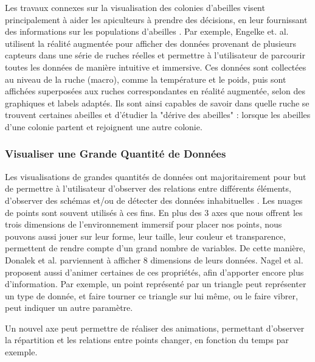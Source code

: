 	
		
		Les travaux connexes sur la visualisation des colonies d'abeilles visent principalement à aider les apiculteurs à prendre des décisions, en leur fournissant des informations sur les populations d'abeilles \cite{engelke_visual_2016, engelke_melissar_2016, nguyen_augmented_2017}. Par exemple, Engelke et. al. \cite{engelke_visual_2016} utilisent la réalité augmentée pour afficher des données provenant de plusieurs capteurs dans une série de ruches réelles et permettre à l'utilisateur de parcourir toutes les données de manière intuitive et immersive. Ces données sont collectées au niveau de la ruche (macro), comme la température et le poids, puis sont affichées superposées aux ruches correspondantes en réalité augmentée, selon des graphiques et labels adaptés. Ils sont ainsi capables de savoir dans quelle ruche se trouvent certaines abeilles et d'étudier la "dérive des abeilles" : lorsque les abeilles d'une colonie partent et rejoignent une autre colonie.
	
	\subsubsection{Visualiser une Grande Quantité de Données}
	
	 Les visualisations de grandes quantités de données ont majoritairement pour but de permettre à l'utilisateur d'observer des relations entre différents éléments, d'observer des schémas et/ou de détecter des données inhabituelles \cite{nagel_methods_2001}.
	Les nuages de points sont souvent utilisés à ces fins. En plus des 3 axes que nous offrent les trois dimensions de l'environnement immersif pour placer nos points, nous pouvons aussi jouer sur leur forme, leur taille, leur couleur et transparence, permettent de rendre compte d'un grand nombre de variables. De cette manière, Donalek et al. \cite{donalek_immersive_2014} parviennent à afficher 8 dimensions de leurs données. Nagel et al. \cite{nagel_methods_2001} proposent aussi d'animer certaines de ces propriétés, afin d'apporter encore plus d'information. Par exemple, un point représenté par un triangle peut représenter un type de donnée, et faire tourner ce triangle sur lui même, ou le faire vibrer, peut indiquer un autre paramètre.
	
	
	
	 Un nouvel axe peut permettre de réaliser des animations, permettant d'observer la répartition et les relations entre points changer, en fonction du temps par exemple.
	
